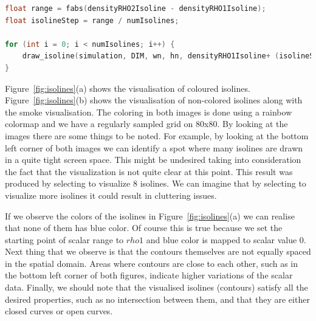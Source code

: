 \begin{lstlisting}[language=C++,label=lst:calculateIsolinesScalars,caption={Calculate scalar between range values and draw isolines.}]
float range = fabs(densityRHO2Isoline - densityRHO1Isoline);
float isolineStep = range / numIsolines;

for (int i = 0; i < numIsolines; i++) {
	draw_isoline(simulation, DIM, wn, hn, densityRHO1Isoline+ (isolineStep * (i + 1)));
}
\end{lstlisting}
 
Figure~\ref{fig:isolines}(a) shows the visualisation of coloured isolines. Figure~\ref{fig:isolines}(b) shows the visualisation of non-colored isolines along with the smoke visualisation. The coloring in both images is done using a rainbow colormap and we have a regularly sampled grid on 80x80. By looking at the images there are some things to be noted. For example, by looking at the bottom left corner of both images we can identify a spot where many isolines are drawn in a quite tight screen space. This might be undesired taking into consideration the fact that the visualization is not quite clear at this point. This result was produced by selecting to visualize 8 isolines. We can imagine that by selecting to visualize more isolines it could result in cluttering issues.

If we observe the colors of the isolines in Figure~\ref{fig:isolines}(a) we can realise that none of them has blue color. Of course this is true because we set the starting point of scalar range to $rho1$ and blue color is mapped to scalar value 0. Next thing that we observe is that the contours themselves are not equally spaced in the spatial domain. Areas where contours are close to each other, such as in the bottom left corner of both figures, indicate higher variations of the scalar data. Finally, we should note that the visualised isolines (contours) satisfy all the desired properties, such as no intersection between them, and that they are either closed curves or open curves.

